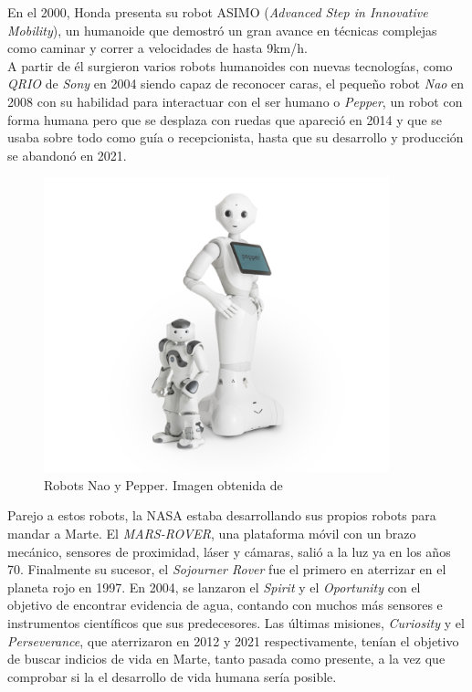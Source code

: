 En el 2000, Honda presenta su robot ASIMO (\textit{Advanced Step in Innovative Mobility}), un humanoide que demostró un gran avance en técnicas
complejas como caminar y correr a velocidades de hasta 9km/h.\\

A partir de él surgieron varios robots humanoides con nuevas tecnologías,
como \textit{QRIO} de \textit{Sony} en 2004 siendo capaz de reconocer caras, el pequeño robot \textit{Nao} en 2008 con su habilidad para
interactuar con el ser humano o \textit{Pepper}, un robot con forma humana pero que se desplaza con ruedas que apareció en 2014 y que se usaba sobre todo
como guía o recepcionista, hasta que su desarrollo y producción se abandonó en 2021.

\begin{figure} [H]
  \begin{center}
    \includegraphics[width=10cm]{figs/c1/nao-pepper.png}
  \end{center}
  \caption[Robots Nao y Pepper]{Robots Nao y Pepper. Imagen obtenida de \cite{nao_pepper}}
  \label{fig:nao_pepper}
\end{figure}

Parejo a estos robots, la NASA estaba desarrollando sus propios robots para mandar a Marte. El \textit{MARS-ROVER}, una plataforma móvil con un brazo mecánico,
sensores de proximidad, láser y cámaras, salió a la luz ya en los años 70. Finalmente su sucesor, el \textit{Sojourner Rover} fue el primero en aterrizar en el
planeta rojo en 1997. En 2004, se lanzaron el \textit{Spirit} y el \textit{Oportunity} con el objetivo de encontrar evidencia de agua, contando con muchos
más sensores e instrumentos científicos que sus predecesores. Las últimas misiones, \textit{Curiosity} y el \textit{Perseverance}, que aterrizaron en
2012 y 2021 respectivamente, tenían el objetivo de buscar indicios de vida en Marte, tanto pasada como presente, a la vez que comprobar si la el desarrollo
de vida humana sería posible.

